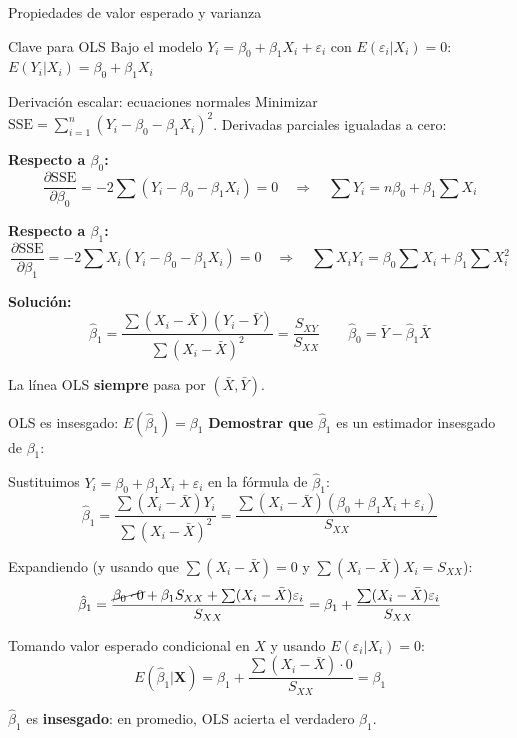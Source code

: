 \documentclass[aspectratio=169, 11pt]{beamer}
\begin{document}
\begin{frame}{Propiedades de valor esperado y varianza}
\small
 

\begin{alertblock}{Clave para OLS}
\small Bajo el modelo $Y_i = \beta_0 + \beta_1 X_i + \varepsilon_i$ con $E(\varepsilon_i | X_i) = 0$:
$E(Y_i | X_i) = \beta_0 + \beta_1 X_i$
\end{alertblock}
\end{frame}

\begin{frame}{Derivación escalar: ecuaciones normales}
\small
Minimizar $\text{SSE} = \sum_{i=1}^n (Y_i - \beta_0 - \beta_1 X_i)^2$. Derivadas parciales igualadas a cero:

\vspace{0.2cm}
\textbf{Respecto a $\beta_0$:}
\[
\frac{\partial \text{SSE}}{\partial \beta_0} = -2 \sum (Y_i - \beta_0 - \beta_1 X_i) = 0 \quad \Rightarrow \quad \sum Y_i = n\beta_0 + \beta_1 \sum X_i
\]

\textbf{Respecto a $\beta_1$:}
\[
\frac{\partial \text{SSE}}{\partial \beta_1} = -2 \sum X_i(Y_i - \beta_0 - \beta_1 X_i) = 0 \quad \Rightarrow \quad \sum X_i Y_i = \beta_0 \sum X_i + \beta_1 \sum X_i^2
\]

\vspace{0.2cm}
\textbf{Solución:}
\[
\boxed{\hat{\beta}_1 = \frac{\sum(X_i - \bar{X})(Y_i - \bar{Y})}{\sum(X_i - \bar{X})^2} = \frac{S_{XY}}{S_{XX}}} \qquad \boxed{\hat{\beta}_0 = \bar{Y} - \hat{\beta}_1 \bar{X}}
\]

La línea OLS \textbf{siempre} pasa por $(\bar{X}, \bar{Y})$.
\end{frame}


\begin{frame}{OLS es insesgado: $E(\hat{\beta}_1) = \beta_1$}
\small
\textbf{Demostrar que} $\hat{\beta}_1$ es un estimador insesgado de $\beta_1$:

\vspace{0.1cm}
Sustituimos $Y_i = \beta_0 + \beta_1 X_i + \varepsilon_i$ en la fórmula de $\hat{\beta}_1$:
\[
\hat{\beta}_1 = \frac{\sum(X_i - \bar{X})Y_i}{\sum(X_i - \bar{X})^2} = \frac{\sum(X_i - \bar{X})(\beta_0 + \beta_1 X_i + \varepsilon_i)}{S_{XX}}
\]

Expandiendo (y usando que $\sum(X_i - \bar{X}) = 0$ y $\sum(X_i - \bar{X})X_i = S_{XX}$):
\[
\hat{\beta}_1 = \frac{\cancel{\beta_0 \cdot 0} + \beta_1 S_{XX} + \sum(X_i - \bar{X})\varepsilon_i}{S_{XX}} = \beta_1 + \frac{\sum(X_i - \bar{X})\varepsilon_i}{S_{XX}}
\]

Tomando valor esperado condicional en $X$ y usando $E(\varepsilon_i | X_i) = 0$:
\[
E(\hat{\beta}_1 | \mathbf{X}) = \beta_1 + \frac{\sum(X_i - \bar{X}) \cdot 0}{S_{XX}} = \boxed{\beta_1}
\]

\begin{alertblock}{}
\small $\hat{\beta}_1$ es \textbf{insesgado}: en promedio, OLS acierta el verdadero $\beta_1$.
\end{alertblock}
\end{frame}
\end{document}
